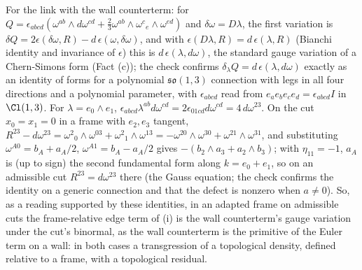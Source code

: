 For the link with the wall counterterm: for $Q = \epsilon_{abcd}(\omega^{ab}\wedge d\omega^{cd} + \tfrac23\omega^{ab}\wedge\omega^{c}{}_{e}\wedge\omega^{ed})$ and $\delta\omega = D\lambda$, the first variation is $\delta Q = 2\epsilon(\delta\omega, R) - d\,\epsilon(\omega, \delta\omega)$, and with $\epsilon(D\lambda, R) = d\,\epsilon(\lambda, R)$ (Bianchi identity and invariance of $\epsilon$) this is $d\,\epsilon(\lambda, d\omega)$, the standard gauge variation of a Chern-Simons form (Fact (c)); the check confirms $\delta_{\lambda}Q = d\,\epsilon(\lambda, d\omega)$ exactly as an identity of forms for a polynomial $\mathfrak{so}(1,3)$ connection with legs in all four directions and a polynomial parameter, with $\epsilon_{abcd}$ read from $e_{a}e_{b}e_{c}e_{d} = \epsilon_{abcd}I$ in $\Cl(1,3)$. For $\lambda = e_{0}\wedge e_{1}$, $\epsilon_{abcd}\lambda^{ab}d\omega^{cd} = 2\epsilon_{01cd}d\omega^{cd} = 4\,d\omega^{23}$. On the cut $x_{0} = x_{1} = 0$ in a frame with $e_{2}, e_{3}$ tangent, $R^{23} - d\omega^{23} = \omega^{2}{}_{0}\wedge\omega^{03} + \omega^{2}{}_{1}\wedge\omega^{13} = -\omega^{20}\wedge\omega^{30} + \omega^{21}\wedge\omega^{31}$, and substituting $\omega^{A0} = b_{A} + a_{A}/2$, $\omega^{A1} = b_{A} - a_{A}/2$ gives $-(b_{2}\wedge a_{3} + a_{2}\wedge b_{3})$; with $\eta_{11} = -1$, $a_{A}$ is (up to sign) the second fundamental form along $k = e_{0} + e_{1}$, so on an admissible cut $R^{23} = d\omega^{23}$ there (the Gauss equation; the check confirms the identity on a generic connection and that the defect is nonzero when $a \neq 0$). So, as a reading supported by these identities, in an adapted frame on admissible cuts the frame-relative edge term of (i) is the wall counterterm's gauge variation under the cut's binormal, as the wall counterterm is the primitive of the Euler term on a wall: in both cases a transgression of a topological density, defined relative to a frame, with a topological residual.

